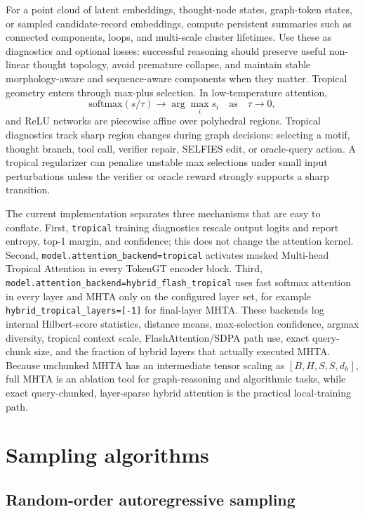 \documentclass[11pt]{article}
\newcommand{\1}{\mathbf{1}}
\begin{document}
For a point cloud of latent embeddings, thought-node states, graph-token states, or sampled candidate-record embeddings, compute persistent summaries such as connected components, loops, and multi-scale cluster lifetimes. Use these as diagnostics and optional losses: successful reasoning should preserve useful non-linear thought topology, avoid premature collapse, and maintain stable morphology-aware and sequence-aware components when they matter. Tropical geometry enters through max-plus selection. In low-temperature attention,
\[
\mathrm{softmax}(s/\tau)\rightarrow \arg\max_i s_i\quad\mathrm{as}\quad\tau\rightarrow0,
\]
and ReLU networks are piecewise affine over polyhedral regions. Tropical diagnostics track sharp region changes during graph decisions: selecting a motif, thought branch, tool call, verifier repair, SELFIES edit, or oracle-query action. A tropical regularizer can penalize unstable max selections under small input perturbations unless the verifier or oracle reward strongly supports a sharp transition.

The current implementation separates three mechanisms that are easy to conflate. First, \texttt{tropical} training diagnostics rescale output logits and report entropy, top-1 margin, and confidence; this does not change the attention kernel. Second, \texttt{model.attention\_backend=tropical} activates masked Multi-head Tropical Attention in every TokenGT encoder block. Third, \texttt{model.attention\_backend=hybrid\_flash\_tropical} uses fast softmax attention in every layer and MHTA only on the configured layer set, for example \texttt{hybrid\_tropical\_layers=[-1]} for final-layer MHTA. These backends log internal Hilbert-score statistics, distance means, max-selection confidence, argmax diversity, tropical context scale, FlashAttention/SDPA path use, exact query-chunk size, and the fraction of hybrid layers that actually executed MHTA. Because unchunked MHTA has an intermediate tensor scaling as \([B,H,S,S,d_h]\), full MHTA is an ablation tool for graph-reasoning and algorithmic tasks, while exact query-chunked, layer-sparse hybrid attention is the practical local-training path.

\section{Sampling algorithms}

\subsection{Random-order autoregressive sampling}
\end{document}
